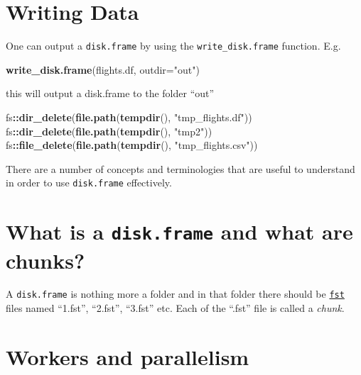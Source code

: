 \documentclass[]{book}
\newenvironment{Shaded}{\begin{snugshade}}{\end{snugshade}}
\newcommand{\DataTypeTok}[1]{\textcolor[rgb]{0.13,0.29,0.53}{#1}}
\newcommand{\KeywordTok}[1]{\textcolor[rgb]{0.13,0.29,0.53}{\textbf{#1}}}
\newcommand{\NormalTok}[1]{#1}
\newcommand{\OperatorTok}[1]{\textcolor[rgb]{0.81,0.36,0.00}{\textbf{#1}}}
\newcommand{\StringTok}[1]{\textcolor[rgb]{0.31,0.60,0.02}{#1}}
\begin{document}
\hypertarget{writing-data}{%
\section{Writing Data}\label{writing-data}}

One can output a \texttt{disk.frame} by using the \texttt{write\_disk.frame} function. E.g.

\begin{Shaded}
\begin{Highlighting}[]
\KeywordTok{write_disk.frame}\NormalTok{(flights.df, }\DataTypeTok{outdir=}\StringTok{"out"}\NormalTok{)}
\end{Highlighting}
\end{Shaded}

this will output a disk.frame to the folder ``out''

\begin{Shaded}
\begin{Highlighting}[]
\NormalTok{fs}\OperatorTok{::}\KeywordTok{dir_delete}\NormalTok{(}\KeywordTok{file.path}\NormalTok{(}\KeywordTok{tempdir}\NormalTok{(), }\StringTok{"tmp_flights.df"}\NormalTok{))}
\NormalTok{fs}\OperatorTok{::}\KeywordTok{dir_delete}\NormalTok{(}\KeywordTok{file.path}\NormalTok{(}\KeywordTok{tempdir}\NormalTok{(), }\StringTok{"tmp2"}\NormalTok{))}
\NormalTok{fs}\OperatorTok{::}\KeywordTok{file_delete}\NormalTok{(}\KeywordTok{file.path}\NormalTok{(}\KeywordTok{tempdir}\NormalTok{(), }\StringTok{"tmp_flights.csv"}\NormalTok{))}
\end{Highlighting}
\end{Shaded}

There are a number of concepts and terminologies that are useful to understand in order to use \texttt{disk.frame} effectively.

\hypertarget{what-is-a-disk.frame-and-what-are-chunks}{%
\section{\texorpdfstring{What is a \texttt{disk.frame} and what are chunks?}{What is a disk.frame and what are chunks?}}\label{what-is-a-disk.frame-and-what-are-chunks}}

A \texttt{disk.frame} is nothing more a folder and in that folder there should be \href{https://www.fstpackage.org/}{\texttt{fst}} files named ``1.fst'', ``2.fst'', ``3.fst'' etc. Each of the ``.fst'' file is called a \emph{chunk}.

\hypertarget{workers-and-parallelism}{%
\section{Workers and parallelism}\label{workers-and-parallelism}}
\end{document}
